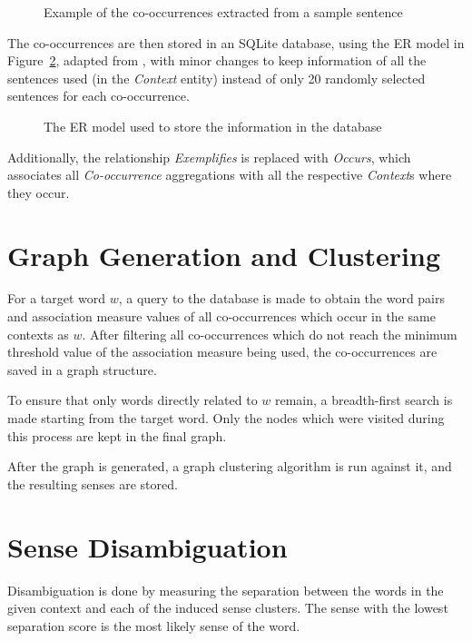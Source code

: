 \begin{figure}[ht]
  \caption{Example of the co-occurrences extracted from a sample sentence}
  \label{fig:orange-example}
  \centering
  
\end{figure}


The co-occurrences are then stored in an SQLite database, using the \ac{ER} model in
Figure~\ref{fig:er-model}, adapted from \citet{correia2015syntax}, with minor 
changes to keep information of all the sentences used (in the \emph{Context}
entity) instead of only 20 randomly selected sentences for each co-occurrence.

\begin{figure}[ht]
    \caption{The \acl*{ER} model used to store the information in the database}
    \label{fig:er-model}
    \centering
    
\end{figure}

Additionally, the relationship \emph{Exemplifies} is replaced with
\emph{Occurs}, which associates all \emph{Co-occurrence} aggregations with all
the respective \emph{Context}s where they occur.

\section{Graph Generation and Clustering}

For a target word $w$, a query to the database is made to obtain the word pairs 
and association measure values of all co-occurrences which occur in the same 
contexts as $w$. After filtering all co-occurrences which do not reach the 
minimum threshold value of the association measure being used, the 
co-occurrences are saved in a graph structure.

To ensure that only words directly related to $w$ remain, a breadth-first 
search is made starting from the target word. Only the nodes which were visited 
during this process are kept in the final graph.

After the graph is generated, a graph clustering algorithm is run against it,
and the resulting senses are stored.

\section{Sense Disambiguation}

Disambiguation is done by measuring the separation between the words in the
given context and each of the induced sense clusters. The sense with the lowest
separation score is the most likely sense of the word.

